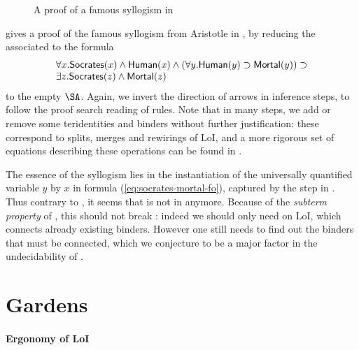 \begin{scope}
\begin{figure*}
  
  \caption{A proof of a famous syllogism in }
\end{figure*}

 gives a proof of the famous syllogism from Aristotle
in , by reducing the  associated to the formula
\begin{equation}
  \begin{array}{l}
    \forall x. \mbox{\textsf{Socrates}}(x) \land \mbox{\textsf{Human}}(x) \land (\forall y. \mbox{\textsf{Human}}(y) \supset \mbox{\textsf{Mortal}}(y)) \supset \\
    \exists z. \mbox{\textsf{Socrates}}(z) \land \mbox{\textsf{Mortal}}(z) \label{eq:socrates-mortal-fo}
  \end{array}
\end{equation}
to the empty $\SA$. Again, we invert the direction of arrows in inference steps,
to follow the proof search reading of rules. Note that in many steps, we add or
remove some teridentities and binders without further justification: these
correspond to splits, merges and rewirings of LoI, and a more rigorous set of
equations describing these operations can be found in \cite[Section 3: ``The
algebra of lines of identity'']{pietarinen_compositional_2020}.

The essence of the syllogism lies in the instantiation of the universally
quantified variable $y$ by $x$ in formula (\ref{eq:socrates-mortal-fo}),
captured by the  step in . Thus
contrary to , it seems that  is not  in
 anymore. Because of the \emph{subterm property} of 
, this should not break :
indeed we should only need  on LoI, which connects already
existing binders. However one still needs to find out the binders that must be
connected, which we conjecture to be a major factor in the undecidability of
.

\section{Gardens}

\paragraph{Ergonomy of LoI}


\end{scope}
